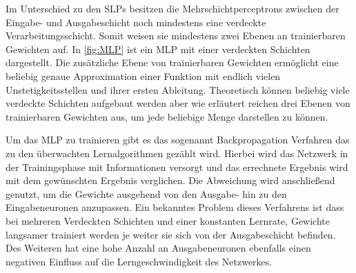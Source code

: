 Im Unterschied zu den SLPs besitzen die Mehrschichtperceptrons zwischen der Eingabe- und Ausgabeschicht noch mindestens eine verdeckte Verarbeitungsschicht. Somit weisen sie mindestens zwei Ebenen an trainierbaren Gewichten auf. In \autoref{fig:MLP} ist ein MLP mit einer verdeckten Schichten dargestellt. Die zusätzliche Ebene von trainierbaren Gewichten ermöglicht eine beliebig genaue Approximation einer Funktion mit endlich vielen Unstetigkeitsstellen und ihrer ersten Ableitung. Theoretisch können beliebig viele verdeckte Schichten aufgebaut werden aber wie \hbox{\citet{dkriesel07}} erläutert reichen drei Ebenen von trainierbaren Gewichten aus, um jede beliebige Menge darstellen zu können.

Um das MLP zu trainieren gibt es das sogenannt Backpropagation Verfahren das zu den überwachten Lernalgorithmen gezählt wird. Hierbei wird das Netzwerk in der Trainingsphase mit Informationen versorgt und das errechnete Ergebnis wird mit dem gewünschten Ergebnis verglichen. Die Abweichung wird anschließend genutzt, um die Gewichte ausgehend von den Ausgabe- hin zu den Eingabeneuronen anzupassen. Ein bekanntes Problem dieses Verfahrens ist dass bei mehreren Verdeckten Schichten und einer konstanten Lernrate, Gewichte langsamer trainiert werden je weiter sie sich von der Ausgabeschicht befinden. Des Weiteren hat eine hohe Anzahl an Ausgabeneuronen ebenfalls einen negativen Einfluss auf die Lerngeschwindigkeit des Netzwerkes.


